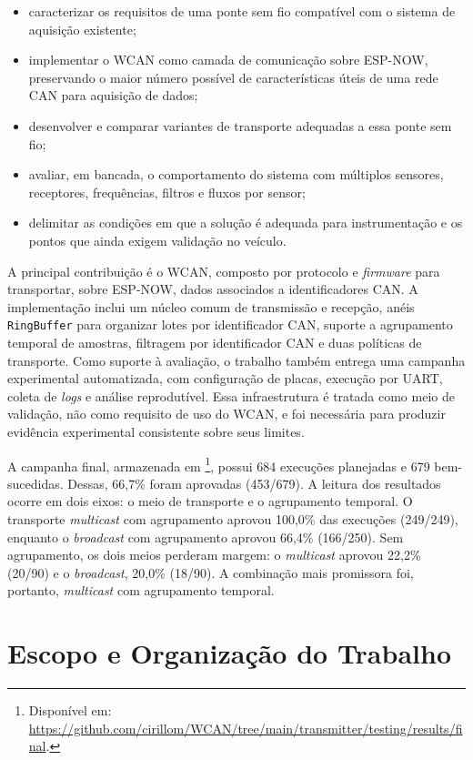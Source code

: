 \begin{itemize}
    \item caracterizar os requisitos de uma ponte sem fio compatível com o sistema
    de aquisição existente;
    \item implementar o WCAN como camada de comunicação sobre ESP-NOW, preservando
    o maior número possível de características úteis de uma rede CAN para
    aquisição de dados;
    \item desenvolver e comparar variantes de transporte adequadas a essa ponte sem
    fio;
    \item avaliar, em bancada, o comportamento do sistema com múltiplos sensores,
    receptores, frequências, filtros e fluxos por sensor;
    \item delimitar as condições em que a solução é adequada para instrumentação
    e os pontos que ainda exigem validação no veículo.
\end{itemize}

A principal contribuição é o WCAN, composto por protocolo e \emph{firmware} para
transportar, sobre ESP-NOW, dados associados a identificadores CAN. A implementação inclui
um núcleo comum de transmissão e recepção, anéis \texttt{RingBuffer} para
organizar lotes por identificador CAN, suporte a agrupamento temporal de amostras, filtragem
por identificador CAN e duas políticas de transporte. Como suporte
à avaliação, o trabalho também entrega uma campanha experimental automatizada,
com configuração de placas, execução por UART, coleta de \emph{logs} e análise
reprodutível. Essa infraestrutura é tratada como meio de validação, não como
requisito de uso do WCAN, e foi necessária para produzir evidência experimental
consistente sobre seus limites.

A campanha final, armazenada em \footnote{Disponível em: \url{https://github.com/cirillom/WCAN/tree/main/transmitter/testing/results/final}.}, possui 684 execuções
planejadas e 679 bem-sucedidas. Dessas, 66,7\% foram aprovadas
(453/679). A leitura dos resultados ocorre em dois eixos: o meio de transporte
e o agrupamento temporal. O transporte \emph{multicast} com agrupamento aprovou 100,0\%
das execuções (249/249), enquanto o \emph{broadcast} com
agrupamento aprovou 66,4\% (166/250). Sem agrupamento, os dois meios perderam
margem: o \emph{multicast} aprovou 22,2\% (20/90) e o \emph{broadcast},
20,0\% (18/90). A combinação mais promissora foi, portanto, \emph{multicast}
com agrupamento temporal.

\section{Escopo e Organização do Trabalho}

